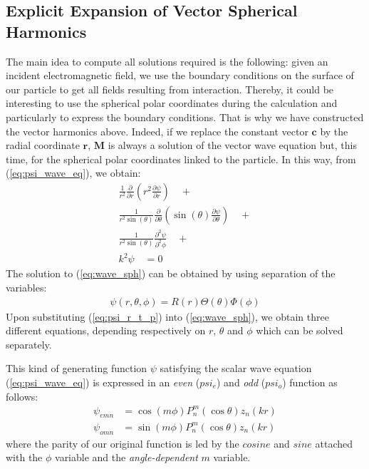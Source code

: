 \documentclass{article}
\numberwithin{equation}{section}
\begin{document}
\subsection{Explicit Expansion of Vector Spherical Harmonics}

The main idea to compute all solutions required is the following: given an incident electromagnetic field, we use the boundary conditions on the surface of our particle to get all fields resulting from interaction. Thereby, it could be interesting to use the spherical polar coordinates during the calculation and particularly to express the boundary conditions. That is why we have constructed the vector harmonics above. Indeed, if we replace the constant vector $\textbf{c}$ by the radial coordinate $\textbf{r}$, $\textbf{M}$ is always a solution of the vector wave equation but, this time, for the spherical polar coordinates linked to the particle. In this way, from (\ref{eq:psi_wave_eq}), we obtain:
\begin{equation}\label{eq:wave_sph}
\begin{aligned}
\frac{1}{r^{2}}\frac{\partial }{\partial r}\left(r^{2}\frac{\partial \psi}{\partial r}\right) \quad + \\ 
\frac{1}{r^{2}\sin(\theta)}\frac{\partial }{\partial \theta}\left(\sin(\theta)\frac{\partial \psi}{\partial \theta}\right) \quad + \\
\frac{1}{r^{2}\sin(\theta)}\frac{\partial^{2} \psi}{\partial^{2} \phi} \quad + \\
k^{2}\psi \quad = 0
\end{aligned}
\end{equation}
The solution to (\ref{eq:wave_sph}) can be obtained by using separation of the variables:
\begin{align}\label{eq:psi_r_t_p}
\psi(r, \theta, \phi) = R(r)\Theta(\theta)\Phi(\phi)
\end{align}
Upon substituting (\ref{eq:psi_r_t_p}) into (\ref{eq:wave_sph}), we obtain three different equations, depending respectively on $r$, $\theta$ and $\phi$ which can be solved separately.

This kind of generating function $\psi$ satisfying the scalar wave equation (\ref{eq:psi_wave_eq}) is expressed in an \textit{even} ($psi_e$) and \textit{odd} ($psi_o$) function as follows:
\begin{align}
\psi_{emn}&=\cos(m\phi)P_{n}^{m}(\cos\theta)z_{n}(kr)\\
\psi_{omn}&=\sin(m\phi)P_{n}^{m}(\cos\theta)z_{n}(kr)
\end{align}
where the parity of our original function is led by the $cosine$ and $sine$ attached with the $\phi$ variable and the \textit{angle-dependent} $m$ variable. 
\end{document}

